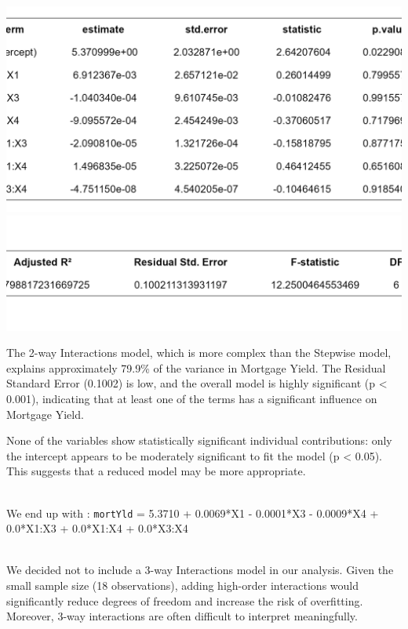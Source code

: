 \documentclass[
  11pt,
]{article}
\begin{document}
\begin{minipage}{0.45\textwidth}
\includegraphics[width=1.1\linewidth]{interaction_model_coef.png}\\
\vspace{0.5em}
\includegraphics[width=1.1\linewidth]{interaction_model_fitstats.png}
\end{minipage}
\hfill
\begin{minipage}{0.52\textwidth}
\small
The 2-way Interactions model, which is more complex than the Stepwise
model, explains approximately 79.9\% of the variance in Mortgage Yield.
The Residual Standard Error (0.1002) is low, and the overall model is
highly significant (p < 0.001), indicating that at least one of the
terms has a significant influence on Mortgage Yield.
\end{minipage}

None of the variables show statistically significant individual
contributions: only the intercept appears to be moderately significant
to fit the model (p \textless{} 0.05). This suggests that a reduced
model may be more appropriate.\\
\strut \\
We end up with : \texttt{mortYld} = 5.3710 + 0.0069*X1 - 0.0001*X3 -
0.0009*X4 + 0.0*X1:X3 + 0.0*X1:X4 + 0.0*X3:X4\\
\strut \\
We decided not to include a 3-way Interactions model in our analysis.
Given the small sample size (18 observations), adding high-order
interactions would significantly reduce degrees of freedom and increase
the risk of overfitting. Moreover, 3-way interactions are often
difficult to interpret meaningfully.
\end{document}
